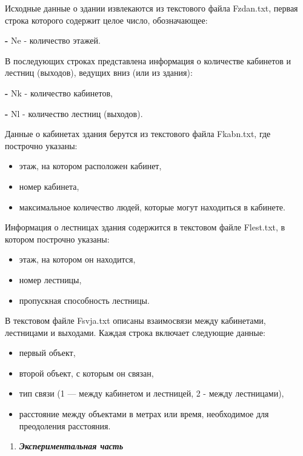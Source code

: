 Исходные данные о здании извлекаются из текстового файла Fzdan.txt,
первая строка которого содержит целое число, обозначающее:

{\bfseries -} Ne - количество этажей.

В последующих строках представлена информация о количестве кабинетов и
лестниц (выходов), ведущих вниз (или из здания):

{\bfseries -} Nk - количество кабинетов,

{\bfseries -} Nl - количество лестниц (выходов).

Данные о кабинетах здания берутся из текстового файла Fkabn.txt, где
построчно указаны:

\begin{itemize}
\item
  этаж, на котором расположен кабинет,
\item
  номер кабинета,
\item
  максимальное количество людей, которые могут находиться в кабинете.
\end{itemize}

Информация о лестницах здания содержится в текстовом файле Flest.txt, в
котором построчно указаны:

\begin{itemize}
\item
  этаж, на котором он находится,
\item
  номер лестницы,
\item
  пропускная способность лестницы.
\end{itemize}

В текстовом файле Fsvja.txt описаны взаимосвязи между кабинетами,
лестницами и выходами. Каждая строка включает следующие данные:

\begin{itemize}
\item
  первый объект,
\item
  второй объект, с которым он связан,
\item
  тип связи (1 --- между кабинетом и лестницей, 2 - между лестницами),
\item
  расстояние между объектами в метрах или время, необходимое для
  преодоления расстояния.
\end{itemize}

\begin{enumerate}
\def\labelenumi{\arabic{enumi}.}
\setcounter{enumi}{3}
\item
  \emph{{\bfseries Экспериментальная часть}}
\end{enumerate}

